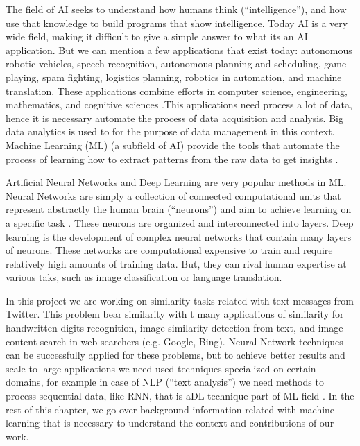 \documentclass[12pt]{report}
\begin{document}
	The field of \ac{AI} seeks to understand how humans think (``intelligence''), and how use that knowledge to build programs that show intelligence. 
	Today \ac{AI} is a very wide field, making it difficult to give a simple answer to what its an AI application. But we can mention a few applications that exist today:  autonomous robotic vehicles, speech recognition, autonomous planning and scheduling, game playing, spam fighting, logistics planning, robotics in 
	automation, and machine translation. These applications combine efforts in computer science, engineering, mathematics, and cognitive sciences \cite{Russell2010}.This applications need process a lot of data, hence it is necessary automate the process of data acquisition and analysis. 
	Big data analytics is used to for the purpose of data management in this context.  Machine Learning (\ac{ML})  (a subfield of \ac{AI}) provide the tools  that automate the process of learning  how to extract patterns from the raw data to get insights \cite{Kelleher2015}.
	
	Artificial Neural Networks and Deep Learning are very popular methods in \ac{ML}. Neural Networks are simply a collection of connected computational 
	units that represent abstractly the human brain (“neurons”) and  aim to achieve learning on a specific task \cite{Russell2010}. These neurons are organized and interconnected into layers. Deep learning is the development of complex neural networks that contain many layers of neurons. These networks are computational expensive to train and require relatively high amounts of training data. But, they can rival human expertise at various taks, such as image classification or language translation.  
	
	In this project we are working on similarity tasks related with text messages from Twitter. This problem bear similarity with t many applications of similarity for handwritten digits recognition, image similarity detection from text, and image content search  in  web searchers (e.g. Google, Bing).  Neural Network techniques can be successfully applied for these problems, but to achieve better results and scale to large applications we need used techniques specialized on certain domains, for example in case of \ac{NLP} (``text analysis'') we need methods to process sequential data, like {RNN}, that is a{DL} technique part of {ML} field \cite{Goodfellow2016}.  In the rest of this chapter, we go over background information related with machine learning that is necessary to understand the context and contributions of our work.
	
\end{document}
